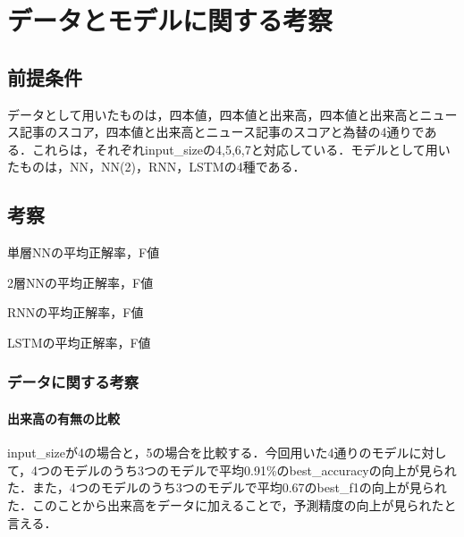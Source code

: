 \documentclass[a4paper,11pt]{ltjsarticle}
\begin{document}
\pagestyle{fancy}
\lhead{}
\cfoot{- \thepage{} -}

\section{データとモデルに関する考察}
\subsection{前提条件}
データとして用いたものは，四本値，四本値と出来高，四本値と出来高とニュース記事のスコア，四本値と出来高とニュース記事のスコアと為替の4通りである．これらは，それぞれinput\_sizeの4,5,6,7と対応している．モデルとして用いたものは，NN，NN(2)，RNN，LSTMの4種である．
\subsection{考察}
\begin{table}[htbp]
  \begin{minipage}[c]{0.45\textwidth}
    \centering
    
    \caption{単層NNの平均正解率，F値}
    \label{tb:panda1}
  \end{minipage}
  \begin{minipage}[c]{0.45\textwidth}
    \centering
    
    \caption{2層NNの平均正解率，F値}
    \label{tb:panda2}
  \end{minipage}
\end{table}
\begin{table}[htbp]
  \begin{minipage}[c]{0.45\textwidth}
    \centering
    
    \caption{RNNの平均正解率，F値}
    \label{tb:panda3}
  \end{minipage}
  \begin{minipage}[c]{0.45\textwidth}
    \centering
    
    \caption{LSTMの平均正解率，F値}
    \label{tb:panda4}
  \end{minipage}
\end{table}
\subsubsection{データに関する考察}
\paragraph{出来高の有無の比較}
input\_sizeが4の場合と，5の場合を比較する．今回用いた4通りのモデルに対して，4つのモデルのうち3つのモデルで平均0.91\%のbest\_accuracyの向上が見られた．また，4つのモデルのうち3つのモデルで平均0.67のbest\_f1の向上が見られた．このことから出来高をデータに加えることで，予測精度の向上が見られたと言える．
\end{document}
